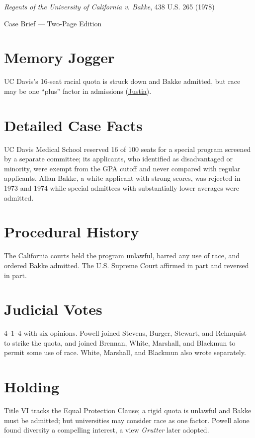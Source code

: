\documentclass[12pt]{article}
\begin{document}
\begin{center}
{\LARGE \textit{Regents of the University of California v. Bakke}, 438 U.S. 265 (1978)\par}
\vspace{0.5em}
{\large Case Brief --- Two-Page Edition\par}
\end{center}

\section{Memory Jogger}
UC Davis's 16-seat racial quota is struck down and Bakke admitted, but race may be one ``plus'' factor in admissions (\href{https://supreme.justia.com/cases/federal/us/438/265/}{Justia}).

\section{Detailed Case Facts}
UC Davis Medical School reserved 16 of 100 seats for a special program screened by a separate committee; its applicants, who identified as disadvantaged or minority, were exempt from the GPA cutoff and never compared with regular applicants. Allan Bakke, a white applicant with strong scores, was rejected in 1973 and 1974 while special admittees with substantially lower averages were admitted.

\section{Procedural History}
The California courts held the program unlawful, barred any use of race, and ordered Bakke admitted. The U.S. Supreme Court affirmed in part and reversed in part.

\section{Judicial Votes}
4--1--4 with six opinions. Powell joined Stevens, Burger, Stewart, and Rehnquist to strike the quota, and joined Brennan, White, Marshall, and Blackmun to permit some use of race. White, Marshall, and Blackmun also wrote separately.

\section{Holding}
Title VI tracks the Equal Protection Clause; a rigid quota is unlawful and Bakke must be admitted; but universities may consider race as one factor. Powell alone found diversity a compelling interest, a view \textit{Grutter} later adopted.
\end{document}

